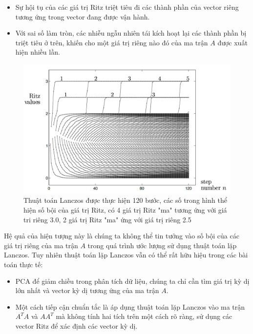 \documentclass[14pt, a4paper]{article}
\numberwithin{equation}{section}
\numberwithin{algorithm}{section}
\numberwithin{figure}{section}
\numberwithin{dl}{section}
\numberwithin{md}{section}
\numberwithin{bd}{section}
\numberwithin{dn}{section}
\begin{document}
\begin{itemize}
    \item Sự hội tụ của các giá trị Ritz triệt tiêu đi các thành phần của vector riêng tương ứng trong vector đang được vận hành.
    \item Với sai số làm tròn, các nhiễu ngẫu nhiên tái kích hoạt lại các thành phần bị triệt tiêu ở trên, khiến cho một giá trị riêng nào đó của ma trận $A$ được xuất hiện nhiều lần.
\end{itemize}

\begin{figure}[h!] \centering

    \includegraphics[scale=0.4]{Lanczos-Repeated-Eigenvalues.jpg}
    \caption{Thuật toán Lanczos được thực hiện 120 bước, các số trong hình thể hiện số bội của giá trị Ritz, có 4 giá trị Ritz "ma" tương ứng với giá tri riêng 3.0, 2 giá trị Ritz "ma" ứng với giá trị riêng 2.5 \cite{trefethen1997numerical}}

    \label{fig:Lanczos-Repeated-Eigenvalues}
\end{figure}

Hệ quả của hiện tượng này là chúng ta không thể tin tưởng vào số bội của các giá trị riêng của ma trận $A$ trong quá trình ước lượng sử dụng thuật toán lặp Lanczos.
Tuy nhiên thuật toán lặp Lanczos vẫn có thể rất hữu hiệu trong các bài toán thực tế:

\begin{itemize}
    \item PCA để giảm chiều trong phân tích dữ liệu, chúng ta chỉ cần tìm giá trị kỳ dị lớn nhất và vector kỳ dị tương ứng của ma trận $A$.
    \item Một cách tiếp cận chuẩn tắc là áp dụng thuật toán lặp Lanczos vào ma trận $A^T A$ và $A A^T$ mà không tính hai tích trên một cách rõ ràng, sử dụng các vector Ritz để xác định các vector kỳ dị.
\end{itemize}
\end{document}
